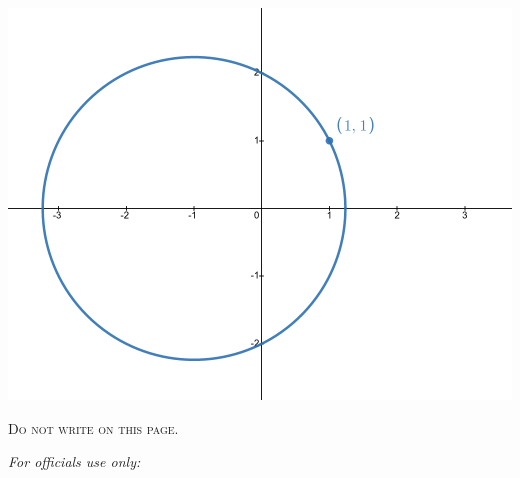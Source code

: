 \documentclass[addpoints, 12pt]{exam}%
\theoremstyle{definition}
\begin{document}
\begin{questions}
\begin{parts}
	\includegraphics[scale=0.27]{cercle}
	\end{parts}

\end{questions}

\newpage
	
	\begin{Large}
	\textsc{Do not write on this page.}
	\end{Large}
	
	\vfill
	
	\textit{For officials use only:}
	\begin{center}
	\gradetable[h][questions]
	\end{center}
	
\end{document}
